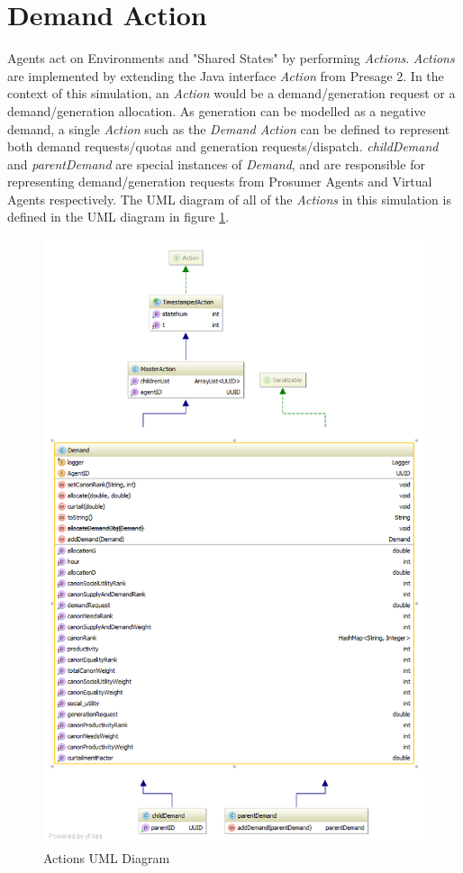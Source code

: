 \clearpage

\section*{Demand Action}
Agents act on Environments and "Shared States" by performing \textit{Actions}. \textit{Actions} are implemented by extending the Java interface \textit{Action} from Presage 2. In the context of this simulation, an \textit{Action} would be a demand/generation request or a demand/generation allocation. As generation can be modelled as a negative demand, a single \textit{Action} such as the \textit{Demand Action} can be defined to represent both demand requests/quotas and generation requests/dispatch. \textit{childDemand} and \textit{parentDemand} are special instances of \textit{Demand}, and are responsible for representing demand/generation requests from Prosumer Agents and Virtual Agents respectively. The UML diagram of all of the \textit{Actions} in this simulation is defined in the UML diagram in figure \ref{fig:ActionUML}.

\begin{figure}[!h]
	\centering
	\includegraphics[scale=0.5]{Images/ActionUML.png}
	\caption{Actions UML Diagram}
	\label{fig:ActionUML}
\end{figure}

